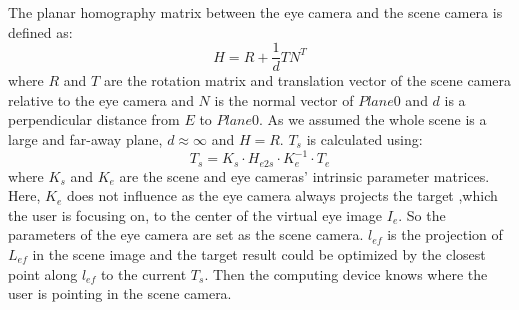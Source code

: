 The planar homography matrix between the eye camera and the scene camera is defined as:
\begin{equation}
\label{eq:homography}
H = R + \frac{1}{d}T{N^T}
\end{equation}
where $R$ and $T$ are the rotation matrix and translation vector of the scene camera relative to the eye camera and $N$ is the normal vector of $Plane0$ and $d$ is a perpendicular distance from $E$ to $Plane0$. As we assumed the whole scene is a large and far-away plane, $d \approx \infty$ and $H=R$.
$T_{s}$ is calculated using:
\begin{equation}
\label{eq:computeTarget}
{T_{s}}= {K_s} \cdot {H_{e2s}} \cdot K_e^{ - 1} \cdot {T_{e}}
\end{equation}
where  $K_s$ and $K_e$ are the scene and eye cameras{\rq} intrinsic parameter matrices. Here, $K_e$ does not influence as the eye camera always projects the target ,which the user is focusing on, to the center  of the virtual eye image $I_{e}$. So the parameters of the eye camera are set as the scene camera. $l_{ef}$ is the projection of $L_{ef}$ in the scene image and the target result could be optimized by the closest point along $l_{ef}$ to the current $T_s$. Then the computing device knows where the user is pointing in the scene camera.


